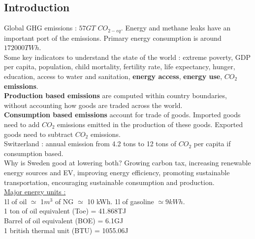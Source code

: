 \documentclass[../main.tex]{subfiles}
\begin{document}
\localtableofcontents

\subsection{Introduction}

Global GHG emissions : $57GT$ $CO_{2-eq}$. Energy and methane leaks have an important port of the emissions. Primary energy consumption is around $172000 TWh$. \\
Some key indicators to understand the state of the world : extreme poverty, GDP per capita, population, child mortality, fertility rate, life expectancy, hunger, education, access to water and sanitation, \textbf{energy access}, \textbf{energy use}, \textbf{$CO_2$ emissions}.\\

\textbf{Production based emissions} are computed within country boundaries, without accounting how goods are traded across the world.\\
\textbf{Consumption based emissions } account for trade of goods. Imported goods need to add $CO_2$ emissions emitted in the production of these goods. Exported goods need to subtract $CO_2$ emissions. \\
Switzerland : annual emission from 4.2 tons to 12 tons of $CO_2$ per capita if consumption based.\\

Why is Sweden good at lowering both? Growing carbon tax, increasing renewable energy sources and EV, improving energy efficiency, promoting sustainable transportation, encouraging sustainable consumption and production.\\

\quad \underline{Major energy units :}\\
1l of oil $\simeq$ 1$m^3$ of NG $\simeq$ 10 kWh. 1l of gasoline $\simeq 9kWh$.\\
1 ton of oil equivalent (Toe) = 41.868TJ\\
Barrel of oil equivalent (BOE) = 6.1GJ\\
1 british thermal unit (BTU) = 1055.06J\\
\end{document}
